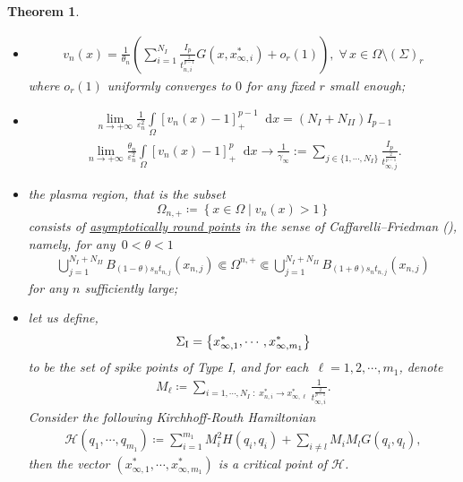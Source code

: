 \documentclass[10pt]{amsart}
\newcommand{\braces}[1]{\left\{#1\right\}} %
\newcommand{\dd}{\mathop{}\!\mathrm{d}}
\newcommand{\eps}{\varepsilon}
\renewcommand{\to}{\rightarrow}
\newcommand{\un}[1]{\underline{#1}}
\newcommand{\ii}{\infty}
\newcommand{\om}{\Omega}
\newtheorem{theorem}{Theorem}[section]
\begin{document}
\begin{theorem}
\begin{itemize}
            \item[(b)]  \begin{align*}
  v_n(x)= \frac{1}{\theta_n}\left(\sum_{i=1}^{N_I} \frac{I_p}{t_{n,i}^{\frac{2}{p-1}}}G(x,x^*_{\ii,i})+o_r(1)\right),\;\forall\, x\in \om\setminus (\Sigma)_r
    \end{align*}
where $o_r(1)$ uniformly converges to $0$ for any fixed $r$ small enough;
           \item[(c)]
           \begin{align}\label{p-1:quant}
              \lim\limits_{n\to+\infty}\frac{1}{\eps_n^2}\int\limits_{\om} [v_n(x)-1]_+^{p-1}\dd{x}=
              (N_I+N_{II})I_{p-1}
            \end{align}
            \begin{align}\label{p-2:nquant}
              \lim\limits_{n\to+\infty}\frac{\theta_n}{\eps_n^2}\int\limits_{\om} [v_n(x)-1]_+^{p}\dd{x}\to
              \frac{1}{\gamma_\ii}:=\sum\limits_{j\in \{1,\cdots,N_I\}}\frac{I_p}{t_{\ii,j}^{\frac{2}{p-1}}}.
            \end{align}

            \item[(d)] the plasma region, that is the subset
            $$
            \Omega_{n,+}\coloneqq\braces{x\in\Omega\mid v_n(x)>1}
            $$
            consists of \un{asymptotically round points} in the sense of Caffarelli--Friedman \mbox{\rm (}\cite{CF}\mbox{\rm )},\\
            namely, for any~$0<\theta<1$
    \begin{align}\label{eq:round pts}
        \bigcup_{j=1}^{N_I+N_{II}} B_{(1-\theta) s_n t_{n,j}}(x_{n,j})
        \Subset \Omega^{n,+}
        \Subset  \bigcup_{j=1}^{N_I+N_{II}} B_{(1+\theta) s_n t_{n,j}}(x_{n,j})
    \end{align}
    for any $n$ sufficiently large;

        \item[(e)] let us define,
    \begin{align*}
        \Sigma_{\rm I} =\braces{x^*_{\ii,1}, \cdots, x^*_{\ii,m_1}}
    \end{align*}
    to be the set of {spike points} of Type I, and for each~$\ell=1,2,\cdots, m_1$, denote
    \begin{align}\label{p-mass}
        M_\ell\coloneqq \sum_{i=1,\cdots,N_{I}\; : \; x^*_{n,i}\to x^*_{\ii,\ell}} \frac{1}{t_{\infty,i}^{\frac{2}{p-1}}}.
    \end{align}
    Consider the following Kirchhoff-Routh Hamiltonian
    \begin{align}\label{KRH}
        \mathcal{H}(q_1, \cdots, q_{m_1})\coloneqq
        \sum_{i=1}^{m_1} M_i^2 H(q_i, q_i)
         + \sum_{i\neq l} M_i M_l G(q_i, q_l),
     \end{align}
     then the vector $(x^*_{\ii,1}, \cdots, x^*_{\ii,m_1})$ is a critical point of $\mathcal{H}$.

        \end{itemize}

    \end{theorem}
\end{document}
